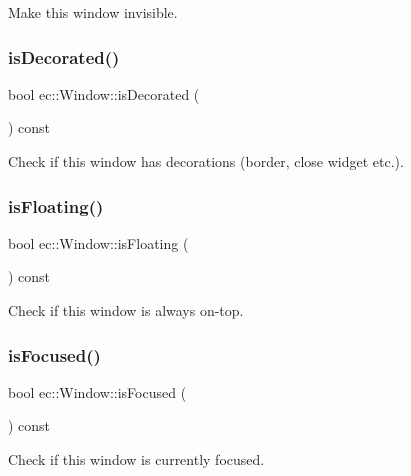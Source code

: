 Make this window invisible. \mbox{\label{classec_1_1_window_a2761ae9079a18f5d62b2ed4715fd9bd1}} 
\subsubsection{\texorpdfstring{is\+Decorated()}{isDecorated()}}
{\footnotesize\ttfamily bool ec\+::\+Window\+::is\+Decorated (\begin{DoxyParamCaption}{ }\end{DoxyParamCaption}) const}

Check if this window has decorations (border, close widget etc.). \mbox{\label{classec_1_1_window_a8e0c04a4c922d351246af64a5d439ba3}} 
\subsubsection{\texorpdfstring{is\+Floating()}{isFloating()}}
{\footnotesize\ttfamily bool ec\+::\+Window\+::is\+Floating (\begin{DoxyParamCaption}{ }\end{DoxyParamCaption}) const}

Check if this window is always on-\/top. \mbox{\label{classec_1_1_window_ac40c6391e9edd720407f8a77d4ee546a}} 
\subsubsection{\texorpdfstring{is\+Focused()}{isFocused()}}
{\footnotesize\ttfamily bool ec\+::\+Window\+::is\+Focused (\begin{DoxyParamCaption}{ }\end{DoxyParamCaption}) const}

Check if this window is currently focused. \mbox{\label{classec_1_1_window_aa4a8cfb938d1a28864e8d0cc265dd96e}} 
